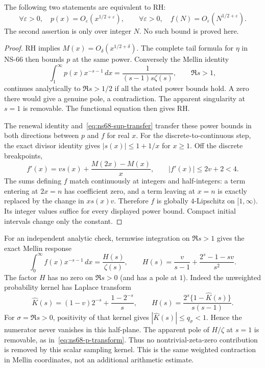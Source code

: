 \begin{proposition}
\label{prop:ns68-scalar-criterion}
The following two statements are equivalent to RH:
\[
 \forall\varepsilon>0,\quad p(x)=O_\varepsilon(x^{1/2+\varepsilon}),
 \qquad
 \forall\varepsilon>0,\quad f(N)=O_\varepsilon(N^{1/2+\varepsilon}).
\]
The second assertion is only over integer $N$. No such bound is
proved here.
\end{proposition}
\begin{proof}
RH implies $M(x)=O_\delta(x^{1/2+\delta})$. The complete tail
formula for $\eta$ in NS-66 then bounds $p$ at the same power.
Conversely the Mellin identity
\begin{equation}
 \int_1^\infty p(x)x^{-s-1}\,dx
             =\frac1{(s-1)s\zeta(s)},\qquad \Re s>1,
 \label{eq:ns68-p-transform}
\end{equation}
continues analytically to $\Re s>1/2$ if all the stated power bounds
hold. A zero there would give a genuine pole, a contradiction.
The apparent singularity at $s=1$ is removable. The functional equation
then gives RH.

The renewal identity and~\eqref{eq:ns68-sup-transfer} transfer these
power bounds in both directions between $p$ and $f$ for real $x$.
For the discrete-to-continuous step, the exact divisor identity gives
$|s(x)|\leq1+1/x$ for $x\geq1$. Off the discrete breakpoints,
\[
 f'(x)=v s(x)+\frac{M(2x)-M(x)}x,
 \qquad |f'(x)|\leq2v+2<4.
\]
The sums defining $f$ match continuously at integers and half-integers:
a term entering at $2x=n$ has coefficient zero, and a term leaving
at $x=n$ is exactly replaced by the change in $xs(x)v$.
Therefore $f$ is globally $4$-Lipschitz on $[1,\infty)$.
Its integer values suffice for every displayed power bound. Compact
initial intervals change only the constant.
\end{proof}

For an independent analytic check, termwise integration on $\Re s>1$
gives the exact Mellin response
\begin{equation}
 \int_0^\infty f(x)x^{-s-1}\,dx
  =\frac{H(s)}{\zeta(s)},\qquad
 H(s)=\frac{v}{s-1}+\frac{2^s-1-sv}{s^2}.
 \label{eq:ns68-forcing-transform}
\end{equation}
The factor $H$ has no zero on $\Re s>0$ (and has a pole at $1$).
Indeed the unweighted probability kernel has Laplace transform
\[
 \widehat K(s)=(1-v)2^{-s}+\frac{1-2^{-s}}s,
 \qquad H(s)=\frac{2^s\{1-\widehat K(s)\}}{s(s-1)}.
\]
For $\sigma=\Re s>0$, positivity of that kernel gives
$|\widehat K(s)|\leq q_\sigma<1$. Hence the numerator never
vanishes in this half-plane. The apparent pole of $H/\zeta$ at
$s=1$ is removable, as in~\eqref{eq:ns68-p-transform}.
Thus no nontrivial-zeta-zero contribution is removed by this scalar
sampling kernel. This is the same weighted contraction in Mellin
coordinates, not an additional arithmetic estimate.

